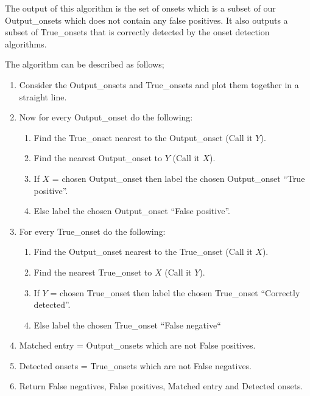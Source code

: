 \documentclass[10pt]{article}
\begin{document}
The output of this algorithm is the set of onsets which is a subset of our Output\_onsets which does not contain any false positives. It also outputs a subset of True\_onsets that is correctly detected by the onset detection algorithms.

The algorithm can be described as follows;

\begin{enumerate}
    \item Consider the Output\_onsets and True\_onsets and plot them together in a straight line.
    \item Now for every Output\_onset do the following:
    \begin{enumerate}
        \item Find the True\_onset nearest to the Output\_onset (Call it $Y$).
        \item Find the nearest Output\_onset to $Y$ (Call it $X$).
        \item If $X$ = chosen Output\_onset then label the chosen Output\_onset “True positive”.
        \item Else label the chosen Output\_onset “False positive”.
    \end{enumerate}
    \item For every True\_onset do the following:
    \begin{enumerate}
        \item Find the Output\_onset nearest to the True\_onset (Call it $X$).
        \item Find the nearest True\_onset to $X$ (Call it $Y$).
        \item If $Y$ = chosen True\_onset then label the chosen True\_onset “Correctly detected”.
        \item Else label the chosen True\_onset “False negative“
    \end{enumerate}
    \item Matched entry = Output\_onsets which are not False positives.
    \item Detected onsets = True\_onsets which are not False negatives.
    \item Return False negatives, False positives, Matched entry and Detected onsets.
\end{enumerate}
\end{document}
